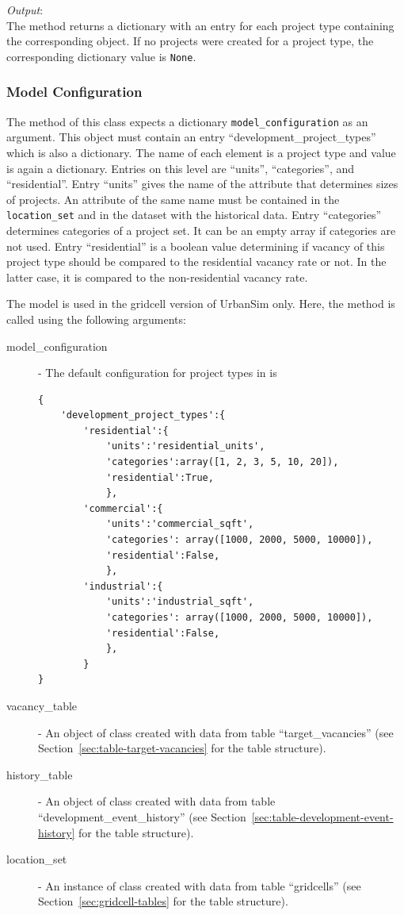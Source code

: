 {\it Output}:~\\[1mm]
The method returns a dictionary with an entry for each project type containing
the corresponding  object. If no projects were
created for a project type, the corresponding dictionary value is \verb|None|.


\subsubsection{Model Configuration}
\label{sec:DPTM-configuration}
The  method of this class expects a dictionary
\verb|model_configuration| as an argument. This object must contain an entry
``development_project_types'' which is also a dictionary. The name of each
element is a project type and value is again a dictionary. Entries on this
level are ``units'', ``categories'', and ``residential''. Entry ``units''
gives the name of the attribute that determines sizes of projects. An
attribute of the same name must be contained in the \verb|location_set| and in
the dataset with the historical data. Entry ``categories'' determines
categories of a project set. It can be an empty array if categories are not
used. Entry ``residential'' is a boolean value determining if vacancy of this
project type should be compared to the residential vacancy rate or not. In the
latter case, it is compared to the non-residential vacancy rate.


The model is used in the gridcell version of UrbanSim only. Here,
the method  is called using the
following arguments:
\begin{description}
\item[model_configuration] - The default configuration for project types in
   is \label{page:model-configuration}
\begin{verbatim}
{
    'development_project_types':{
        'residential':{
            'units':'residential_units',
            'categories':array([1, 2, 3, 5, 10, 20]),
            'residential':True,
            },
        'commercial':{
            'units':'commercial_sqft',
            'categories': array([1000, 2000, 5000, 10000]),
            'residential':False,
            },
        'industrial':{
            'units':'industrial_sqft',
            'categories': array([1000, 2000, 5000, 10000]),
            'residential':False,
            },
        }
}
\end{verbatim}
\item[vacancy_table] - An object of class  created
  with data from table ``target_vacancies'' (see
  Section~\ref{sec:table-target-vacancies} for the table structure).
\item[history_table] - An object of class  created
  with data from table ``development_event_history'' (see
  Section~\ref{sec:table-development-event-history} for the  table structure).
\item[location_set] - An instance of class  created with
  data from table ``gridcells'' (see Section~\ref{sec:gridcell-tables} for the
  table structure).
\end{description}

